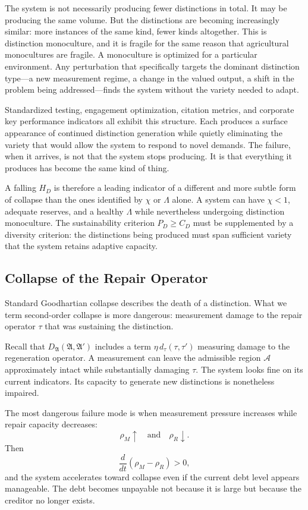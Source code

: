 \documentclass[12pt, a4paper]{article}
\theoremstyle{flyxion}
\newcommand{\fA}{\mathfrak{A}}
\newcommand{\cA}{\mathcal{A}}
\newcommand{\DA}{D_{\fA}}
\newcommand{\rhoM}{\rho_{M}}
\newcommand{\rhoR}{\rho_{R}}
\begin{document}
The system is not necessarily producing fewer distinctions in total. It may be producing the same volume. But the distinctions are becoming increasingly similar: more instances of the same kind, fewer kinds altogether. This is distinction monoculture, and it is fragile for the same reason that agricultural monocultures are fragile. A monoculture is optimized for a particular environment. Any perturbation that specifically targets the dominant distinction type---a new measurement regime, a change in the valued output, a shift in the problem being addressed---finds the system without the variety needed to adapt.

Standardized testing, engagement optimization, citation metrics, and corporate key performance indicators all exhibit this structure. Each produces a surface appearance of continued distinction generation while quietly eliminating the variety that would allow the system to respond to novel demands. The failure, when it arrives, is not that the system stops producing. It is that everything it produces has become the same kind of thing.

A falling $H_D$ is therefore a leading indicator of a different and more subtle form of collapse than the ones identified by $\chi$ or $\Lambda$ alone. A system can have $\chi < 1$, adequate reserves, and a healthy $\Lambda$ while nevertheless undergoing distinction monoculture. The sustainability criterion $P_D \geq C_D$ must be supplemented by a diversity criterion: the distinctions being produced must span sufficient variety that the system retains adaptive capacity.

\subsection*{Collapse of the Repair Operator}

Standard Goodhartian collapse describes the death of a distinction. What we term second-order collapse is more dangerous: measurement damage to the repair operator $\tau$ that was sustaining the distinction.

Recall that $\DA(\fA, \fA')$ includes a term $\eta\, d_\tau(\tau, \tau')$ measuring damage to the regeneration operator. A measurement can leave the admissible region $\cA$ approximately intact while substantially damaging $\tau$. The system looks fine on its current indicators. Its capacity to generate new distinctions is nonetheless impaired.

The most dangerous failure mode is when measurement pressure increases while repair capacity decreases:
\[
  \rhoM \uparrow \quad \text{and} \quad \rhoR \downarrow.
\]
Then
\[
  \frac{d}{dt}(\rhoM - \rhoR) > 0,
\]
and the system accelerates toward collapse even if the current debt level appears manageable. The debt becomes unpayable not because it is large but because the creditor no longer exists.
\end{document}
